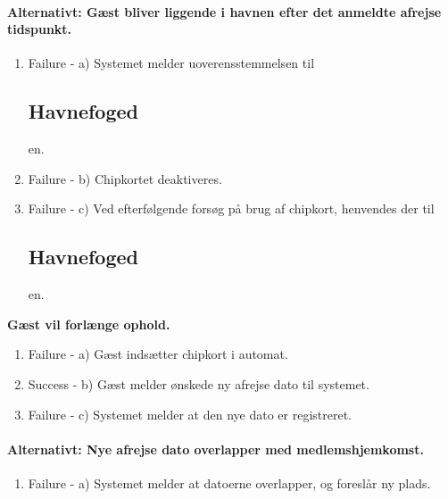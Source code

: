 {{{	\paragraph{Alternativt: Gæst bliver liggende i havnen efter det anmeldte afrejse tidspunkt.}
	  \begin{enumerate}
			\item Failure -  a) Systemet melder uoverensstemmelsen til \subsection{Havnefoged}en.
			\item Failure -  b) Chipkortet deaktiveres.
			\item Failure -  c) Ved efterfølgende forsøg på brug af chipkort, henvendes der til \subsection{Havnefoged}en.
	   \end{enumerate}
			
	\item{\bf{Gæst vil forlænge ophold.}
	  \begin{enumerate}
			\item Failure -  a) Gæst indsætter chipkort i automat.
			\item Success -  b) Gæst melder ønskede ny afrejse dato til systemet.
			\item Failure -  c) Systemet melder at den nye dato er registreret.
	   \end{enumerate}
     
	\paragraph{Alternativt: Nye afrejse dato overlapper med medlemshjemkomst.}
	  \begin{enumerate}
			\item Failure -  a) Systemet melder at datoerne overlapper, og foreslår ny plads.
	   \end{enumerate}
      
}}}}
